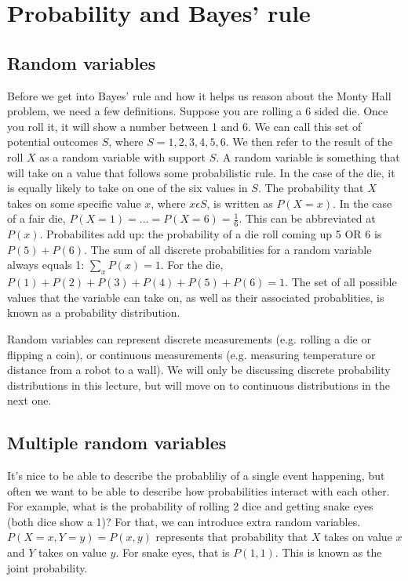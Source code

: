 \documentclass[12pt]{article} %
\begin{document}


\section{Probability and Bayes' rule}
\subsection{Random variables}
Before we get into Bayes' rule and how it helps us reason about the Monty Hall problem, we need a few definitions.  Suppose you are rolling a 6 sided die.  Once you roll it, it will show a number between 1 and 6.  We can call this set of potential outcomes $S$, where $S = {1, 2, 3, 4, 5, 6}$.  We then refer to the result of the roll $X$ as a random variable with support $S$.  A random variable is something that will take on a value that follows some probabilistic rule.  In the case of the die, it is equally likely to take on one of the six values in $S$.  The probability that $X$ takes on some specific value $x$, where $x \epsilon S$, is written as $P(X = x)$.  In the case of a fair die, $P(X = 1) = ... = P(X = 6) = \frac{1}{6}$.  This can be abbreviated at $P(x)$.
Probabilites add up:  the probability of a die roll coming up 5 OR 6 is $P(5) + P(6)$.  The sum of all discrete probabilities for a random variable always equals 1:  $\sum_{x}^{}P(x) = 1$. For the die, $P(1) + P(2) + P(3) + P(4) + P(5) + P(6) = 1$.  The set of all possible values that the variable can take on, as well as their associated probablities, is known as a probability distribution.

Random variables can represent discrete measurements (e.g. rolling a die or flipping a coin), or continuous measurements (e.g. measuring temperature or distance from a robot to a wall).  We will only be discussing discrete probability distributions in this lecture, but will move on to continuous distributions in the next one.

\subsection{Multiple random variables}
It's nice to be able to describe the probabliliy of a single event happening, but often we want to be able to describe how probabilities interact with each other.  For example, what is the probability of rolling 2 dice and getting snake eyes (both dice show a 1)?  For that, we can introduce extra random variables.  $P(X = x, Y = y) = P(x, y)$ represents that probability that $X$ takes on value $x$ and $Y$ takes on value $y$.  For snake eyes, that is $P(1, 1)$.  This is known as the joint probability.
\end{document}
